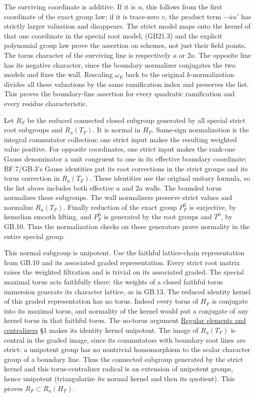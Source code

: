 \documentclass[
  11pt,
]{article}
\begin{document}
The surviving coordinate is additive. If it is \(u\), this follows from
the first coordinate of the exact group law; if it is trace-zero \(v\),
the product term \(-\bar u u'\) has strictly larger valuation and
disappears. The strict model maps onto the kernel of that one coordinate
in the special root model; (GB21.3) and the explicit polynomial group
law prove the assertion on schemes, not just their field points. The
torus character of the surviving line is respectively \(a\) or \(2a\).
The opposite line has its negative character, since the boundary
normalizer conjugates the two models and fixes the wall. Rescaling
\(\omega_E\) back to the original \(k\)-normalization divides all these
valuations by the same ramification index and preserves the list. This
proves the boundary-line assertion for every quadratic ramification and
every residue characteristic.

Let \(R_F\) be the reduced connected closed subgroup generated by all
special strict root subgroups and \(R_u(T_F)\). It is normal in \(H_F\).
Same-sign normalization is the integral commutator collection: one
strict input makes the resulting weighted value positive. For opposite
coordinates, one strict input makes the rank-one Gauss denominator a
unit congruent to one in its effective boundary coordinate; BF.7/GB.3's
Gauss identities put its root corrections in the strict groups and its
torus correction in \(R_u(T_F)\). These identities use the original
unitary formula, so the list above includes both effective \(a\) and
\(2a\) walls. The bounded torus normalizes these subgroups. The wall
normalizers preserve strict values and normalize \(R_u(T_F)\). Finally
reduction of the exact group \(P_F^0\) is surjective, by henselian
smooth lifting, and \(P_F^0\) is generated by the root groups and
\(T^0\), by GB.10. Thus the normalization checks on these generators
prove normality in the entire special group.

This normal subgroup is unipotent. Use the faithful lattice-chain
representation from GB.10 and its associated graded representation.
Every strict root matrix raises the weighted filtration and is trivial
on its associated graded. The special maximal torus acts faithfully
there: the weights of a closed faithful torus immersion generate its
character lattice, as in GB.13. The reduced identity kernel of this
graded representation has no torus. Indeed every torus of \(H_F\) is
conjugate into its maximal torus, and normality of the kernel would put
a conjugate of any kernel torus in that faithful torus. The no-torus
argument \href{../AG-RG/AG-RG-02.html}{Regular elements and
centralizers} §1 makes its identity kernel unipotent. The image of
\(R_u(T_F)\) is central in the graded image, since its commutators with
boundary root lines are strict: a unipotent group has no nontrivial
homomorphism to the scalar character group of a boundary line. Thus the
connected subgroup generated by the strict kernel and this
torus-centralizer radical is an extension of unipotent groups, hence
unipotent (triangularize its normal kernel and then its quotient). This
proves \(R_F\subset R_u(H_F)\).
\end{document}
